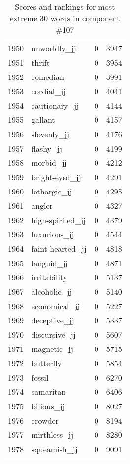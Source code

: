 \begin{longtable}[!htbp]{| rlr@{.}l |}
    1950 & unworldly\_jj & 0 & 3947 \\
    1951 & thrift & 0 & 3954 \\
    1952 & comedian & 0 & 3991 \\
    1953 & cordial\_jj & 0 & 4041 \\
    1954 & cautionary\_jj & 0 & 4144 \\
    1955 & gallant & 0 & 4157 \\
    1956 & slovenly\_jj & 0 & 4176 \\
    1957 & flashy\_jj & 0 & 4199 \\
    1958 & morbid\_jj & 0 & 4212 \\
    1959 & bright-eyed\_jj & 0 & 4291 \\
    1960 & lethargic\_jj & 0 & 4295 \\
    1961 & angler & 0 & 4327 \\
    1962 & high-spirited\_jj & 0 & 4379 \\
    1963 & luxurious\_jj & 0 & 4544 \\
    1964 & faint-hearted\_jj & 0 & 4818 \\
    1965 & languid\_jj & 0 & 4871 \\
    1966 & irritability & 0 & 5137 \\
    1967 & alcoholic\_jj & 0 & 5140 \\
    1968 & economical\_jj & 0 & 5227 \\
    1969 & deceptive\_jj & 0 & 5337 \\
    1970 & discursive\_jj & 0 & 5607 \\
    1971 & magnetic\_jj & 0 & 5715 \\
    1972 & butterfly & 0 & 5854 \\
    1973 & fossil & 0 & 6270 \\
    1974 & samaritan & 0 & 6406 \\
    1975 & bilious\_jj & 0 & 8027 \\
    1976 & crowder & 0 & 8194 \\
    1977 & mirthless\_jj & 0 & 8280 \\
    1978 & squeamish\_jj & 0 & 9091 \\
    \hline
    \caption{Scores and rankings for most extreme 30 words in component \#107} \\
\end{longtable}
